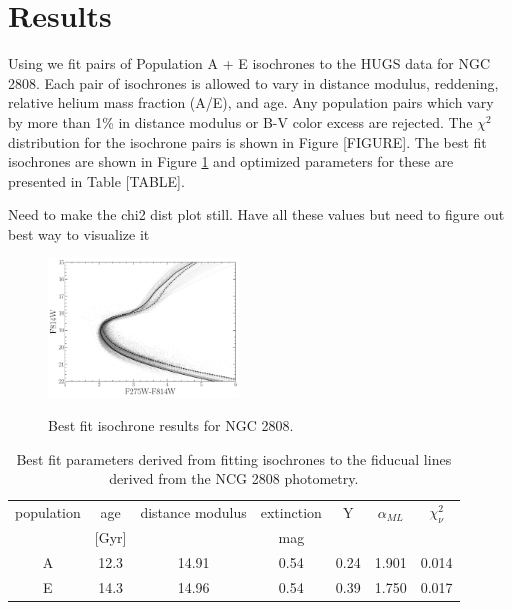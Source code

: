 \section{Results}\label{sec:results}
Using \fidanka we fit pairs of Population A + E isochrones to the HUGS data for
NGC 2808. Each pair of isochrones is allowed to vary in distance modulus,
reddening, relative helium mass fraction (A/E), and age. Any population pairs which vary by more than 1\% in distance modulus or B-V color excess are rejected. The $\chi^{2}$
distribution for the isochrone pairs is shown in Figure {\color{red}[FIGURE]}.
The best fit isochrones are shown in Figure \ref{fig:BestFitResults} and optimized
parameters for these are presented in Table {\color{red}[TABLE]}.

{\color{red} Need to make the chi2 dist plot still. Have all these values but need to figure out best way to visualize it}

\begin{figure}
  \centering
  \includegraphics[width=0.45\textwidth]{src/figures/BestFitResults.pdf}
  \label{fig:BestFitResults}
  \caption{Best fit isochrone results for NGC 2808.}
\end{figure}

\begin{table}
  \centering
  \begin{tabular}{c | c c c c c c}
    \hline
    population & age & distance modulus & extinction & Y & $\alpha_{ML}$ & $\chi^{2}_{\nu}$\\
    & [Gyr] & & mag & & &\\
    \hline
    \hline
    A & 12.3 & 14.91 & 0.54 & 0.24 & 1.901 & 0.014\\
    E & 14.3 & 14.96 & 0.54 & 0.39 & 1.750 & 0.017 \\
    \hline
  \end{tabular}
  \label{tab:BestFitResults}
  \caption{Best fit parameters derived from fitting isochrones to the fiducual lines derived from the NCG 2808 photometry.}
\end{table}

